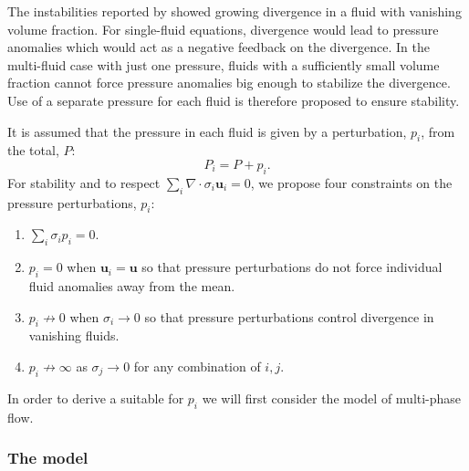 \documentclass[draft]{agujournal2019}
\begin{document}
The instabilities reported by  showed growing divergence
in a fluid with vanishing volume fraction. For single-fluid equations, divergence would lead to pressure anomalies which would act as a negative feedback on the divergence.  {In the multi-fluid case with just one pressure, fluids with a sufficiently small volume fraction} cannot force pressure anomalies big enough to stabilize the divergence. Use of a separate pressure for each fluid is therefore proposed to ensure stability.

It is assumed that the  pressure  in each fluid is given by a perturbation, $p_{i}$, from the total, $P$:
\begin{equation}
P_{i}=P+p_{i}.
\end{equation}
For stability and to respect $\sum_i \nabla\cdot\sigma_i\mathbf{u}_i=0$, we propose four constraints on the pressure perturbations, $p_i$:
\begin{enumerate}
\item $\sum_{i}\sigma_{i}p_{i}=0$.
\item $p_i=0$ when $\mathbf{u}_{i}=\mathbf{u}$ so that pressure perturbations do not force individual fluid anomalies away from the mean.
\item $p_i \not\to 0$ when $\sigma_i\to 0$ so that pressure perturbations control divergence in vanishing fluids.
\item $p_i\not\to\infty$ as $\sigma_j\to 0$ for any combination of $i,j$.
\end{enumerate}


In order to derive a suitable  for $p_i$ we will first consider the  model of multi-phase flow.

\subsubsection{The \protect{} model}
\end{document}
